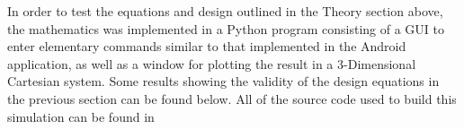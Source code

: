 In order to test the equations and design outlined in the Theory section above, the mathematics was implemented in a Python program consisting of a GUI to enter elementary commands similar to that implemented in the Android application, as well as a window for plotting the result in a 3-Dimensional Cartesian system. Some results showing the validity of the design equations in the previous section can be found below. All of the source code used to build this simulation can be found in 